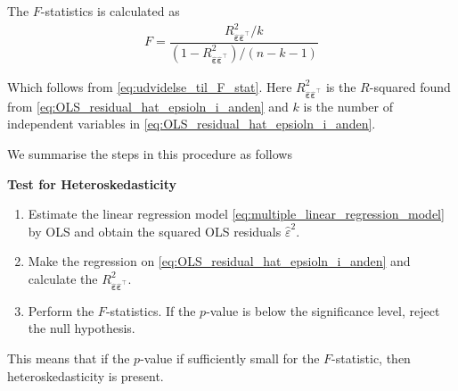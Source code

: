 The $F$-statistics is calculated as
\begin{align*}
    F = \dfrac{R^2_{\hat{\boldsymbol{\varepsilon}}\hat{\boldsymbol{\varepsilon}}^\top}/k}{(1-R^2_{\hat{\boldsymbol{\varepsilon}}\hat{\boldsymbol{\varepsilon}}^\top}) / (n-k-1)}
\end{align*}

Which follows from \eqref{eq:udvidelse_til_F_stat}.
Here $R^2_{\hat{\boldsymbol{\varepsilon}}\hat{\boldsymbol{\varepsilon}}^\top}$ is the $R$-squared found from \eqref{eq:OLS_residual_hat_epsioln_i_anden} and $k$ is the number of independent variables in \eqref{eq:OLS_residual_hat_epsioln_i_anden}. 

We summarise the steps in this procedure as follows

\textbf{Test for Heteroskedasticity}
\begin{enumerate}[label=(\roman*)]
    \item Estimate the linear regression model \eqref{eq:multiple_linear_regression_model} by OLS and obtain the squared OLS residuals $\hat{\varepsilon}^2$. 
    \item Make the regression on \eqref{eq:OLS_residual_hat_epsioln_i_anden} and calculate the $R^2_{\hat{\boldsymbol{\varepsilon}}\hat{\boldsymbol{\varepsilon}}^\top}$. 
    \item Perform the $F$-statistics. If the $p$-value is below the significance level, reject the null hypothesis. 
\end{enumerate}

This means that if the $p$-value if sufficiently small for the $F$-statistic, then heteroskedasticity is present. 










